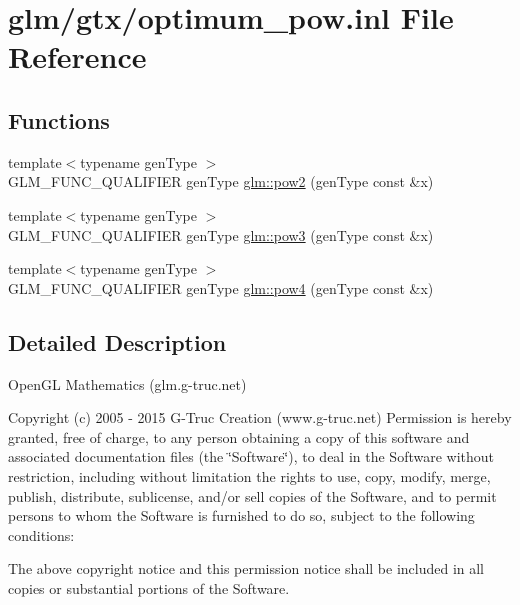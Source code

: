 \hypertarget{optimum__pow_8inl}{\section{glm/gtx/optimum\-\_\-pow.inl File Reference}
\label{optimum__pow_8inl}
}
\subsection*{Functions}
\begin{DoxyCompactItemize}
\item 
{\footnotesize template$<$typename gen\-Type $>$ }\\G\-L\-M\-\_\-\-F\-U\-N\-C\-\_\-\-Q\-U\-A\-L\-I\-F\-I\-E\-R gen\-Type \hyperlink{group__gtx__optimum__pow_ga19aaff3213bf23bdec3ef124ace237e9}{glm\-::pow2} (gen\-Type const \&x)
\item 
{\footnotesize template$<$typename gen\-Type $>$ }\\G\-L\-M\-\_\-\-F\-U\-N\-C\-\_\-\-Q\-U\-A\-L\-I\-F\-I\-E\-R gen\-Type \hyperlink{group__gtx__optimum__pow_ga35689d03cd434d6ea819f1942d3bf82e}{glm\-::pow3} (gen\-Type const \&x)
\item 
{\footnotesize template$<$typename gen\-Type $>$ }\\G\-L\-M\-\_\-\-F\-U\-N\-C\-\_\-\-Q\-U\-A\-L\-I\-F\-I\-E\-R gen\-Type \hyperlink{group__gtx__optimum__pow_gacef0968763026e180e53e735007dbf5a}{glm\-::pow4} (gen\-Type const \&x)
\end{DoxyCompactItemize}


\subsection{Detailed Description}
Open\-G\-L Mathematics (glm.\-g-\/truc.\-net)

Copyright (c) 2005 -\/ 2015 G-\/\-Truc Creation (www.\-g-\/truc.\-net) Permission is hereby granted, free of charge, to any person obtaining a copy of this software and associated documentation files (the \char`\"{}\-Software\char`\"{}), to deal in the Software without restriction, including without limitation the rights to use, copy, modify, merge, publish, distribute, sublicense, and/or sell copies of the Software, and to permit persons to whom the Software is furnished to do so, subject to the following conditions\-:

The above copyright notice and this permission notice shall be included in all copies or substantial portions of the Software.

